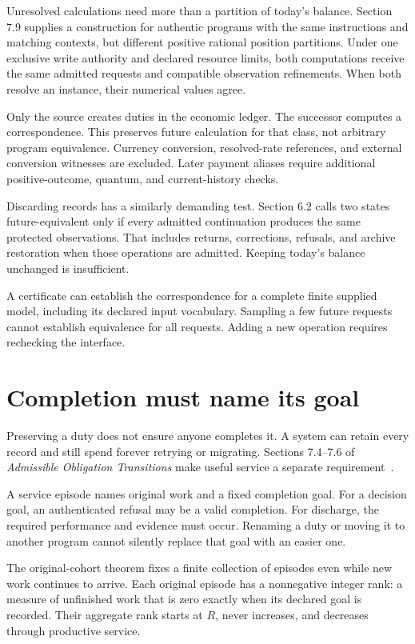\documentclass{momentum}
\begin{document}
Unresolved calculations need more than a partition of today's balance. Section 7.9 supplies a construction for authentic programs with the same instructions and matching contexts, but different positive rational position partitions. Under one exclusive write authority and declared resource limits, both computations receive the same admitted requests and compatible observation refinements. When both resolve an instance, their numerical values agree.

Only the source creates duties in the economic ledger. The successor computes a correspondence. This preserves future calculation for that class, not arbitrary program equivalence. Currency conversion, resolved-rate references, and external conversion witnesses are excluded. Later payment aliases require additional positive-outcome, quantum, and current-history checks.

Discarding records has a similarly demanding test. Section 6.2 calls two states future-equivalent only if every admitted continuation produces the same protected observations. That includes returns, corrections, refusals, and archive restoration when those operations are admitted. Keeping today's balance unchanged is insufficient.

A certificate can establish the correspondence for a complete finite supplied model, including its declared input vocabulary. Sampling a few future requests cannot establish equivalence for all requests. Adding a new operation requires rechecking the interface.

\section{Completion must name its goal}
\label{sec:service}

Preserving a duty does not ensure anyone completes it. A system can retain every record and still spend forever retrying or migrating. Sections 7.4--7.6 of \emph{Admissible Obligation Transitions} make useful service a separate requirement~\cite{aot}.

A service episode names original work and a fixed completion goal. For a decision goal, an authenticated refusal may be a valid completion. For discharge, the required performance and evidence must occur. Renaming a duty or moving it to another program cannot silently replace that goal with an easier one.

The original-cohort theorem fixes a finite collection of episodes even while new work continues to arrive. Each original episode has a nonnegative integer rank: a measure of unfinished work that is zero exactly when its declared goal is recorded. Their aggregate rank starts at $R$, never increases, and decreases through productive service.
\end{document}
